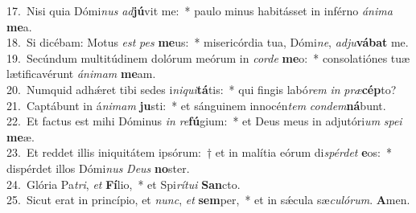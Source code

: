{17.~}Nisi quia Dómi\textit{nus} \textit{ad}\textbf{jú}vit me:~* paulo minus habitásset in inférno \textit{á}\textit{ni}\textit{ma} \textbf{me}a.\\
{18.~}Si dicébam: Motus \textit{est} \textit{pes} \textbf{me}us:~* misericórdia tua, Dómi\textit{ne}, \textit{ad}\textit{ju}\textbf{vá}\textbf{bat} me.\\
{19.~}Secúndum multitúdinem dolórum meórum in \textit{cor}\textit{de} \textbf{me}o:~* consolatiónes tuæ lætificavérunt \textit{á}\textit{ni}\textit{mam} \textbf{me}am.\\
{20.~}Numquid adhǽret tibi sedes i\textit{ni}\textit{qui}\textbf{tá}tis:~* qui fingis labó\textit{rem} \textit{in} \textit{præ}\textbf{cép}to?\\
{21.~}Captábunt in á\textit{ni}\textit{mam} \textbf{ju}sti:~* et sánguinem innocén\textit{tem} \textit{con}\textit{dem}\textbf{ná}bunt.\\
{22.~}Et factus est mihi Dóminus \textit{in} \textit{re}\textbf{fú}gium:~* et Deus meus in adjutóri\textit{um} \textit{spe}\textit{i} \textbf{me}æ.\\
{23.~}Et reddet illis iniquitátem ipsórum:~† et in malítia eórum di\textit{spér}\textit{det} \textbf{e}os:~* dispérdet illos Dómi\textit{nus} \textit{De}\textit{us} \textbf{no}ster.\\
{24.~}Glória Pa\textit{tri}, \textit{et} \textbf{Fí}lio,~* et Spi\textit{rí}\textit{tu}\textit{i} \textbf{San}cto.\\
{25.~}Sicut erat in princípio, et \textit{nunc}, \textit{et} \textbf{sem}per,~* et in sǽcula sæ\textit{cu}\textit{ló}\textit{rum}. \textbf{A}men.\\
